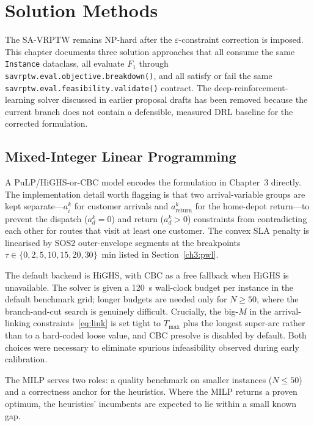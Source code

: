 \chapter{Solution Methods}
\label{ch5}

The SA-VRPTW remains NP-hard after the
$\varepsilon$-constraint correction is imposed. This chapter
documents three solution approaches that all consume the same
\texttt{Instance} dataclass, all evaluate $F_1$ through
\texttt{savrptw.eval.objective.breakdown()}, and all satisfy or fail
the same \texttt{savrptw.eval.feasibility.validate()} contract. The
deep-reinforcement-learning solver discussed in earlier proposal
drafts has been removed because the current branch does not contain a
defensible, measured DRL baseline for the corrected formulation.

\section{Mixed-Integer Linear Programming}
\label{ch5:milp}

A PuLP/HiGHS-or-CBC model encodes the formulation in Chapter~3
directly. The implementation detail worth flagging is that two
arrival-variable groups are kept separate---$a_i^k$ for customer
arrivals and $a_{\text{return}}^k$ for the home-depot return---to
prevent the dispatch ($a_d^k = 0$) and return ($a_d^k > 0$)
constraints from contradicting each other for routes that visit at
least one customer. The convex SLA penalty is linearised by SOS2
outer-envelope segments at the breakpoints
$\tau \in \{0, 2, 5, 10, 15, 20, 30\}$~min listed in
Section~\ref{ch3:pwl}.

The default backend is HiGHS, with CBC as a free fallback when HiGHS
is unavailable. The solver is given a 120~s wall-clock budget per
instance in the default benchmark grid; longer budgets are needed
only for $N \geq 50$, where the branch-and-cut search is genuinely
difficult. Crucially, the big-$M$ in the arrival-linking
constraints~\eqref{eq:link} is set tight to $T_{\max}$ plus the
longest super-arc rather than to a hard-coded loose value, and CBC
presolve is disabled by default. Both choices were necessary to
eliminate spurious infeasibility observed during early calibration.

The MILP serves two roles: a quality benchmark on smaller instances
($N \leq 50$) and a correctness anchor for the heuristics. Where the
MILP returns a proven optimum, the heuristics' incumbents are
expected to lie within a small known gap.

